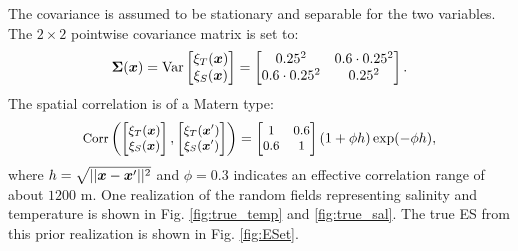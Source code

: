 \documentclass[aoas]{imsart}
\begin{document}
The covariance is assumed to be stationary and separable for the two variables. 
The $2 \times 2$ pointwise covariance matrix is set to:
\begin{equation}\label{v0}
\bSigma(\bx)=\mbox{Var} 
\begin{bmatrix}
    \xi_T(\bx) \\
    \xi_S(\bx) 
    \end{bmatrix}=
\begin{bmatrix}
0.25^2 & 0.6 \cdot 0.25^2 \\
0.6 \cdot 0.25^2 & 0.25^2
\end{bmatrix}.
\end{equation}
The spatial correlation is of a Matern type:
\begin{equation}\label{v}
\small
\mbox{Corr} 
\left(
\begin{bmatrix}
    \xi_T(\bx) \\
    \xi_S(\bx) 
    \end{bmatrix},
    \begin{bmatrix}
    \xi_T(\bx') \\
    \xi_S(\bx') 
    \end{bmatrix}
    \right)
    = \begin{bmatrix}
1 & 0.6  \\
0.6  & 1
\end{bmatrix}(1+\phi h)\exp (-\phi h),
\end{equation}
where $h=\sqrt{||{\boldsymbol x}-{\boldsymbol x}'||^2}$ and $\phi=0.3$ indicates an effective correlation range of about $1200$ m. 
One realization of the random fields representing salinity and
temperature is shown in Fig. \ref{fig:true_temp} and
\ref{fig:true_sal}. The true ES from this prior realization is shown
in Fig. \ref{fig:ESet}.
\end{document}
